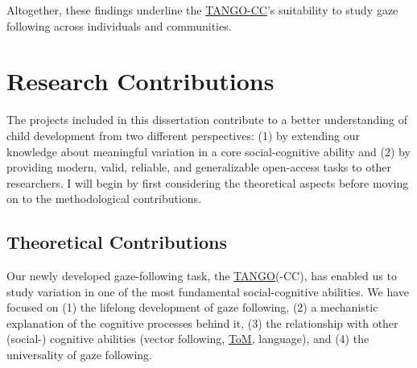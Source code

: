 \documentclass[
]{scrbook}
\begin{document}
Altogether, these findings underline the \hyperref[acronyms_TANGO-CC]{TANGO-CC}'s suitability to study gaze following across individuals and communities.

\section{Research Contributions}\label{contributions}

The projects included in this dissertation contribute to a better understanding of child development from two different perspectives: (1) by extending our knowledge about meaningful variation in a core social-cognitive ability and (2) by providing modern, valid, reliable, and generalizable open-access tasks to other researchers. I will begin by first considering the theoretical aspects before moving on to the methodological contributions.

\subsection{Theoretical Contributions}\label{contributions-theory}

Our newly developed gaze-following task, the \hyperref[acronyms_TANGO]{TANGO}(-CC), has enabled us to study variation in one of the most fundamental social-cognitive abilities. We have focused on (1) the lifelong development of gaze following, (2) a mechanistic explanation of the cognitive processes behind it, (3) the relationship with other (social-) cognitive abilities (vector following, \hyperref[acronyms_ToM]{ToM}, language), and (4) the universality of gaze following.
\end{document}
